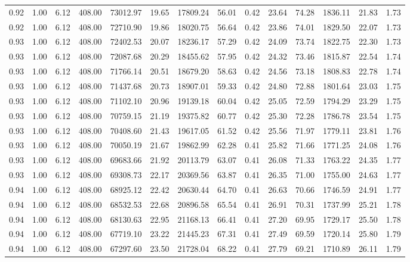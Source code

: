 \begin{table}[!ht]
\begin{tabular}{rrrrrrrrrrrrrr}
0.92 & 1.00 & 6.12 & 408.00 & 73012.97 & 19.65 & 17809.24 & 56.01 & 0.42 & 23.64 & 74.28 & 1836.11 & 21.83 & 1.73 \\
0.92 & 1.00 & 6.12 & 408.00 & 72710.90 & 19.86 & 18020.75 & 56.64 & 0.42 & 23.86 & 74.01 & 1829.50 & 22.07 & 1.73 \\
0.93 & 1.00 & 6.12 & 408.00 & 72402.53 & 20.07 & 18236.17 & 57.29 & 0.42 & 24.09 & 73.74 & 1822.75 & 22.30 & 1.73 \\
0.93 & 1.00 & 6.12 & 408.00 & 72087.68 & 20.29 & 18455.62 & 57.95 & 0.42 & 24.32 & 73.46 & 1815.87 & 22.54 & 1.74 \\
0.93 & 1.00 & 6.12 & 408.00 & 71766.14 & 20.51 & 18679.20 & 58.63 & 0.42 & 24.56 & 73.18 & 1808.83 & 22.78 & 1.74 \\
0.93 & 1.00 & 6.12 & 408.00 & 71437.68 & 20.73 & 18907.01 & 59.33 & 0.42 & 24.80 & 72.88 & 1801.64 & 23.03 & 1.75 \\
0.93 & 1.00 & 6.12 & 408.00 & 71102.10 & 20.96 & 19139.18 & 60.04 & 0.42 & 25.05 & 72.59 & 1794.29 & 23.29 & 1.75 \\
0.93 & 1.00 & 6.12 & 408.00 & 70759.15 & 21.19 & 19375.82 & 60.77 & 0.42 & 25.30 & 72.28 & 1786.78 & 23.54 & 1.75 \\
0.93 & 1.00 & 6.12 & 408.00 & 70408.60 & 21.43 & 19617.05 & 61.52 & 0.42 & 25.56 & 71.97 & 1779.11 & 23.81 & 1.76 \\
0.93 & 1.00 & 6.12 & 408.00 & 70050.19 & 21.67 & 19862.99 & 62.28 & 0.41 & 25.82 & 71.66 & 1771.25 & 24.08 & 1.76 \\
0.93 & 1.00 & 6.12 & 408.00 & 69683.66 & 21.92 & 20113.79 & 63.07 & 0.41 & 26.08 & 71.33 & 1763.22 & 24.35 & 1.77 \\
0.93 & 1.00 & 6.12 & 408.00 & 69308.73 & 22.17 & 20369.56 & 63.87 & 0.41 & 26.35 & 71.00 & 1755.00 & 24.63 & 1.77 \\
0.94 & 1.00 & 6.12 & 408.00 & 68925.12 & 22.42 & 20630.44 & 64.70 & 0.41 & 26.63 & 70.66 & 1746.59 & 24.91 & 1.77 \\
0.94 & 1.00 & 6.12 & 408.00 & 68532.53 & 22.68 & 20896.58 & 65.54 & 0.41 & 26.91 & 70.31 & 1737.99 & 25.21 & 1.78 \\
0.94 & 1.00 & 6.12 & 408.00 & 68130.63 & 22.95 & 21168.13 & 66.41 & 0.41 & 27.20 & 69.95 & 1729.17 & 25.50 & 1.78 \\
0.94 & 1.00 & 6.12 & 408.00 & 67719.10 & 23.22 & 21445.23 & 67.31 & 0.41 & 27.49 & 69.59 & 1720.14 & 25.80 & 1.79 \\
0.94 & 1.00 & 6.12 & 408.00 & 67297.60 & 23.50 & 21728.04 & 68.22 & 0.41 & 27.79 & 69.21 & 1710.89 & 26.11 & 1.79 \\

\end{tabular}
\end{table}
